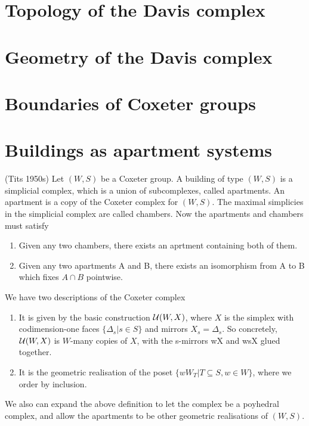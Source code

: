 \documentclass[11pt]{article}
\begin{document}
\section{Topology of the Davis complex}
\section{Geometry of the Davis complex}
\section{Boundaries of Coxeter groups}


\section{Buildings as apartment systems}

\begin{definition}
    (Tits 1950s) Let $(W,S)$ be a Coxeter group. A building of type $(W,S)$ is a simplicial complex, which is a union of subcomplexes, called apartments. An apartment is a copy of the Coxeter complex for $(W,S)$. The maximal simplicies in the simplicial complex are called chambers. Now the apartments and chambers must satisfy
    \begin{enumerate}
    \item Given any two chambers, there exists an aprtment containing both of them.
    \item Given any two apartments A and B, there exists an isomorphism from A to B which fixes $A \cap B$ pointwise. 
    \end{enumerate}
\end{definition}

We have two descriptions of the Coxeter complex
\begin{enumerate}
    \item It is given by the basic construction $\mathcal{U}(W,X)$, where $X$ is the simplex with codimension-one faces $\{\Delta_s|s\in S\}$ and mirrors $X_s=\Delta_s.$ So concretely, $\mathcal{U}(W,X)$ is $W$-many copies of $X$, with the s-mirrors wX and wsX glued together. 
    \item It is the geometric realisation of the poset $\{wW_T|T\subseteq S, w\in W\}$, where we order by inclusion.
\end{enumerate}

We also can expand the above definition to let the complex be a poyhedral complex, and allow the apartments to be other geometric realisations of $(W,S)$. 
\end{document}
